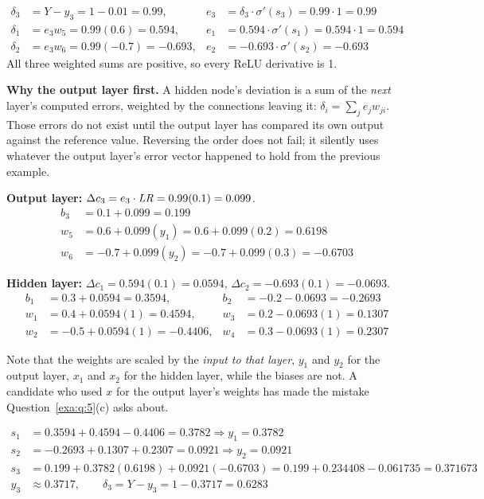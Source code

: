 \begin{align*}
  \delta_3 &= Y - y_3 = 1 - 0.01 = 0.99, & e_3 &= \delta_3 \cdot \sigma'(s_3) = 0.99 \cdot 1 =
    \mathbf{0.99} \\
  \delta_1 &= e_3 w_5 = 0.99(0.6) = 0.594, & e_1 &= 0.594 \cdot \sigma'(s_1) = 0.594 \cdot 1 =
    \mathbf{0.594} \\
  \delta_2 &= e_3 w_6 = 0.99(-0.7) = -0.693, & e_2 &= -0.693 \cdot \sigma'(s_2) = \mathbf{-0.693}
\end{align*}
All three weighted sums are positive, so every ReLU derivative is 1. 

\textbf{Why the output layer first.} A hidden node's deviation is a sum of the \emph{next} layer's
computed errors, weighted by the connections leaving it: $\delta_i = \sum_j e_j w_{ji}$. Those errors
do not exist until the output layer has compared its own output against the reference value.
Reversing the order does not fail; it silently uses whatever the output layer's error vector happened
to hold from the previous example. 

\textbf{Output layer:} $\Delta c_3 = e_3 \cdot \mathit{LR} = 0.99(0.1) = 0.099$.
\begin{align*}
  b_3 &= 0.1 + 0.099 = \mathbf{0.199} \\
  w_5 &= 0.6 + 0.099(y_1) = 0.6 + 0.099(0.2) = \mathbf{0.6198} \\
  w_6 &= -0.7 + 0.099(y_2) = -0.7 + 0.099(0.3) = \mathbf{-0.6703}
\end{align*}

\textbf{Hidden layer:} $\Delta c_1 = 0.594(0.1) = 0.0594$, $\Delta c_2 = -0.693(0.1) = -0.0693$.
\begin{align*}
  b_1 &= 0.3 + 0.0594 = \mathbf{0.3594}, & b_2 &= -0.2 - 0.0693 = \mathbf{-0.2693} \\
  w_1 &= 0.4 + 0.0594(1) = \mathbf{0.4594}, & w_3 &= 0.2 - 0.0693(1) = \mathbf{0.1307} \\
  w_2 &= -0.5 + 0.0594(1) = \mathbf{-0.4406}, & w_4 &= 0.3 - 0.0693(1) = \mathbf{0.2307}
\end{align*}

Note that the weights are scaled by the \emph{input to that layer}, $y_1$ and $y_2$ for the output
layer, $x_1$ and $x_2$ for the hidden layer, while the biases are not. A candidate who used $x$ for
the output layer's weights has made the mistake Question~\ref{exa:q:5}(c) asks about.

\begin{align*}
  s_1 &= 0.3594 + 0.4594 - 0.4406 = 0.3782 \Rightarrow y_1 = 0.3782 \\
  s_2 &= -0.2693 + 0.1307 + 0.2307 = 0.0921 \Rightarrow y_2 = 0.0921 \\
  s_3 &= 0.199 + 0.3782(0.6198) + 0.0921(-0.6703) = 0.199 + 0.234408 - 0.061735 = 0.371673 \\
  y_3 &\approx \mathbf{0.3717}, \qquad \delta_3 = Y - y_3 = 1 - 0.3717 = \mathbf{0.6283}
\end{align*}

